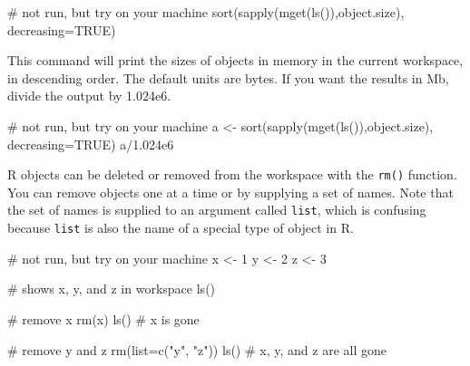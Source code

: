 \documentclass[
  13,
  letterpaper,
]{report}
\newenvironment{Shaded}{\begin{snugshade}}{\end{snugshade}}
\newcommand{\AttributeTok}[1]{\textcolor[rgb]{0.40,0.45,0.13}{#1}}
\newcommand{\CommentTok}[1]{\textcolor[rgb]{0.37,0.37,0.37}{#1}}
\newcommand{\ConstantTok}[1]{\textcolor[rgb]{0.56,0.35,0.01}{#1}}
\newcommand{\DecValTok}[1]{\textcolor[rgb]{0.68,0.00,0.00}{#1}}
\newcommand{\FloatTok}[1]{\textcolor[rgb]{0.68,0.00,0.00}{#1}}
\newcommand{\FunctionTok}[1]{\textcolor[rgb]{0.28,0.35,0.67}{#1}}
\newcommand{\NormalTok}[1]{\textcolor[rgb]{0.00,0.23,0.31}{#1}}
\newcommand{\OtherTok}[1]{\textcolor[rgb]{0.00,0.23,0.31}{#1}}
\newcommand{\SpecialCharTok}[1]{\textcolor[rgb]{0.37,0.37,0.37}{#1}}
\newcommand{\StringTok}[1]{\textcolor[rgb]{0.13,0.47,0.30}{#1}}
\begin{document}
\begin{Shaded}
\begin{Highlighting}[]
\CommentTok{\# not run, but try on your machine}
\FunctionTok{sort}\NormalTok{(}\FunctionTok{sapply}\NormalTok{(}\FunctionTok{mget}\NormalTok{(}\FunctionTok{ls}\NormalTok{()),object.size), }\AttributeTok{decreasing=}\ConstantTok{TRUE}\NormalTok{)}
\end{Highlighting}
\end{Shaded}

This command will print the sizes of objects in memory in the current
workspace, in descending order. The default units are bytes. If you want
the results in Mb, divide the output by 1.024e6.

\begin{Shaded}
\begin{Highlighting}[]
\CommentTok{\# not run, but try on your machine}
\NormalTok{a }\OtherTok{\textless{}{-}} \FunctionTok{sort}\NormalTok{(}\FunctionTok{sapply}\NormalTok{(}\FunctionTok{mget}\NormalTok{(}\FunctionTok{ls}\NormalTok{()),object.size), }\AttributeTok{decreasing=}\ConstantTok{TRUE}\NormalTok{)}
\NormalTok{a}\SpecialCharTok{/}\FloatTok{1.024e6}
\end{Highlighting}
\end{Shaded}

R objects can be deleted or removed from the workspace with the
\texttt{rm()} function. You can remove objects one at a time or by
supplying a set of names. Note that the set of names is supplied to an
argument called \texttt{list}, which is confusing because \texttt{list}
is also the name of a special type of object in R.

\begin{Shaded}
\begin{Highlighting}[]
\CommentTok{\# not run, but try on your machine}
\NormalTok{x }\OtherTok{\textless{}{-}} \DecValTok{1}
\NormalTok{y }\OtherTok{\textless{}{-}} \DecValTok{2}
\NormalTok{z }\OtherTok{\textless{}{-}} \DecValTok{3}

\CommentTok{\# shows x, y, and z in workspace}
\FunctionTok{ls}\NormalTok{() }

\CommentTok{\# remove x}
\FunctionTok{rm}\NormalTok{(x)}
\FunctionTok{ls}\NormalTok{() }\CommentTok{\# x is gone}

\CommentTok{\# remove y and z}
\FunctionTok{rm}\NormalTok{(}\AttributeTok{list=}\FunctionTok{c}\NormalTok{(}\StringTok{"y"}\NormalTok{, }\StringTok{"z"}\NormalTok{))}
\FunctionTok{ls}\NormalTok{() }\CommentTok{\# x, y, and z are all gone}
\end{Highlighting}
\end{Shaded}
\end{document}
